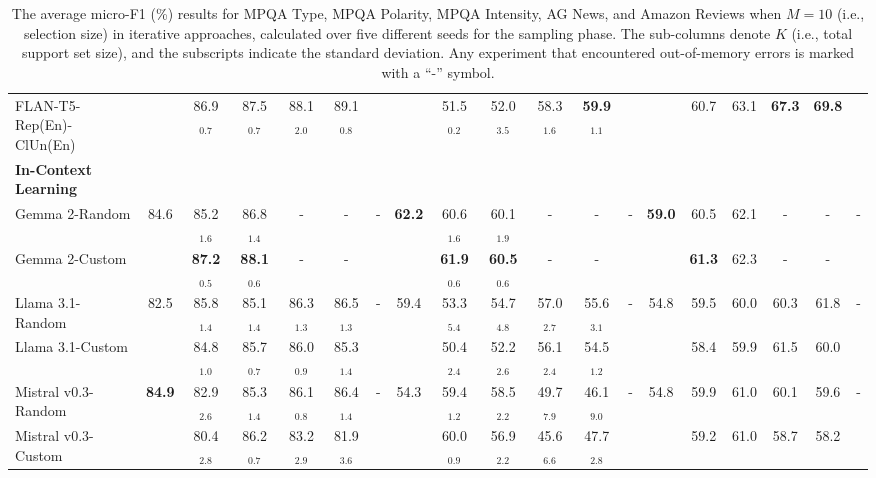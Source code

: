 \documentclass[11pt]{article}
\theoremstyle{definition}
\begin{document}
\begin{table*}[hbt]
{\begin{tabular}{l|cccccc|cccccc|cccccc}
FLAN-T5-Rep(En)-ClUn(En) &
& 86.9$_{0.7}$ & 87.5$_{0.7}$ & 88.1$_{2.0}$ & 89.1$_{0.8}$ & &
& 51.5$_{0.2}$ & 52.0$_{3.5}$ & 58.3$_{1.6}$ & \textbf{59.9}$_{1.1}$ & &
& 60.7 & 63.1 & \textbf{67.3} & \textbf{69.8} & \\

\hdashline

\textbf{In-Context Learning} &
& & & & & &
& & & & & &
& & & & & \\

Gemma 2-Random &
84.6 & 85.2$_{1.6}$ & 86.8$_{1.4}$ & - & - & - &
\textbf{62.2} & 60.6$_{1.6}$ & 60.1$_{1.9}$ & - & - & - &
\textbf{59.0} & 60.5 & 62.1 & - & - & - \\

Gemma 2-Custom &
& \textbf{87.2}$_{0.5}$ & \textbf{88.1}$_{0.6}$ & - & - & &
& \textbf{61.9}$_{0.6}$ & \textbf{60.5}$_{0.6}$ & - & - & &
& \textbf{61.3} & 62.3 & - & - & \\

\hdashline[1pt/4pt]

Llama 3.1-Random &
82.5 & 85.8$_{1.4}$ & 85.1$_{1.4}$ & 86.3$_{1.3}$ & 86.5$_{1.3}$ & - &
59.4 & 53.3$_{5.4}$ & 54.7$_{4.8}$ & 57.0$_{2.7}$ & 55.6$_{3.1}$ & - &
54.8 & 59.5 & 60.0 & 60.3 & 61.8 & - \\

Llama 3.1-Custom &
& 84.8$_{1.0}$ & 85.7$_{0.7}$ & 86.0$_{0.9}$ & 85.3$_{1.4}$ & &
& 50.4$_{2.4}$ & 52.2$_{2.6}$ & 56.1$_{2.4}$ & 54.5$_{1.2}$ & &
& 58.4 & 59.9 & 61.5 & 60.0 & \\

\hdashline[1pt/4pt]

Mistral v0.3-Random &
\textbf{84.9} & 82.9$_{2.6}$ & 85.3$_{1.4}$ & 86.1$_{0.8}$ & 86.4$_{1.4}$ & - &
54.3 & 59.4$_{1.2}$ & 58.5$_{2.2}$ & 49.7$_{7.9}$ & 46.1$_{9.0}$ & - &
54.8 & 59.9 & 61.0 & 60.1 & 59.6 & - \\

Mistral v0.3-Custom &
& 80.4$_{2.8}$ & 86.2$_{0.7}$ & 83.2$_{2.9}$ & 81.9$_{3.6}$ & &
& 60.0$_{0.9}$ & 56.9$_{2.2}$ & 45.6$_{6.6}$ & 47.7$_{2.8}$ & &
& 59.2 & 61.0 & 58.7 & 58.2 & \\

\hline
\end{tabular}
}
\caption{The average micro-F1 (\%) results for MPQA Type, MPQA Polarity, MPQA Intensity, AG News, and Amazon Reviews when $M=10$ (i.e., selection size) in iterative approaches, calculated over five different seeds for the sampling phase. The sub-columns denote $K$ (i.e., total support set size), and the subscripts indicate the standard deviation. Any experiment that encountered out-of-memory errors is marked with a ``-'' symbol.}
\label{table:afl}
\end{table*}
\end{document}

